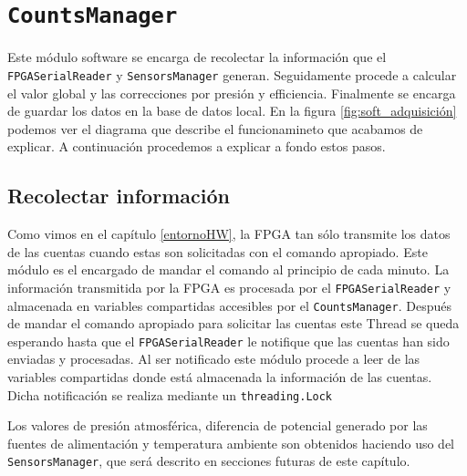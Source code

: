 \section{\texttt{CountsManager}}
	Este módulo software se encarga de recolectar la información que el \texttt{FPGASerialReader} y \texttt{SensorsManager} generan. Seguidamente
	procede a calcular el valor global y las correcciones por presión y efficiencia. Finalmente se encarga de guardar los datos en la base de
	datos local. En la figura \ref{fig:soft_adquisición} podemos ver el diagrama que describe el funcionamineto que acabamos de explicar. A
	continuación procedemos a explicar a fondo estos pasos.
	\subsection{Recolectar información}
		Como vimos en el capítulo \ref{entornoHW}, la FPGA tan sólo transmite los datos de las cuentas cuando estas son solicitadas con el
		comando apropiado. Este módulo es el encargado de mandar el comando al principio de cada minuto. La información transmitida por la
		FPGA es procesada por el \texttt{FPGASerialReader} y almacenada en variables compartidas accesibles por el \texttt{CountsManager}.
		Después de mandar el comando apropiado para solicitar las cuentas este Thread se queda esperando hasta que el
		\texttt{FPGASerialReader} le notifique que las cuentas han sido enviadas y procesadas. Al ser notificado este módulo procede a leer
		de las variables compartidas donde está almacenada la información de las cuentas. Dicha notificación se realiza mediante un
		\texttt{threading.Lock}
		\par
		Los valores de presión atmosférica, diferencia de potencial generado por las fuentes de alimentación y temperatura ambiente son
		obtenidos haciendo uso del \texttt{SensorsManager}, que será descrito en secciones futuras de este capítulo.
